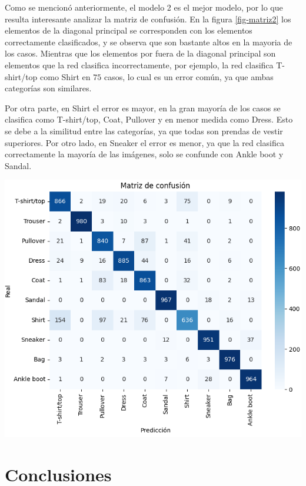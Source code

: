 \documentclass[aps,prl,reprint,groupedaddress]{revtex4-2}
\newenvironment{Figura}
  {\par\medskip\noindent\minipage{\linewidth}}
  {\endminipage\par\medskip}
\begin{document}
Como se mencionó anteriormente, el modelo 2 es el mejor modelo, por lo que 
resulta interesante analizar la matriz de confusión. En la figura \ref{fig-matriz2}
los elementos de la diagonal principal se corresponden con los elementos 
correctamente clasificados, y se observa que son bastante altos en la mayoria de 
los casos. Mientras que los elementos por fuera de la diagonal principal son 
elementos que la red clasifica incorrectamente, por ejemplo, la red clasifica 
T-shirt/top como Shirt en $75$ casos, lo cual es un error común, ya que ambas 
categorías son similares.

Por otra parte, en Shirt el error es mayor, en la gran mayoría de los casos 
se clasifica como T-shirt/top, Coat, Pullover y en menor medida
como Dress. Esto se debe a la similitud entre las categorías, ya que todas
son prendas de vestir superiores. Por otro lado, en Sneaker el error es menor, 
ya que la red clasifica correctamente la mayoría de las imágenes, solo se confunde 
con Ankle boot y Sandal.

\begin{Figura}
  \centering
  \includegraphics[width=1\textwidth]{figs/matrix_model2.png}
  \label{fig-matriz2}
\end{Figura}

\section{Conclusiones}
\end{document}

